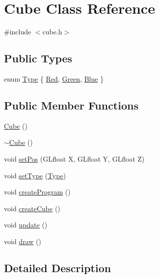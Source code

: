 \hypertarget{class_cube}{}\section{Cube Class Reference}
\label{class_cube}


{\ttfamily \#include $<$cube.\+h$>$}

\subsection*{Public Types}
\begin{DoxyCompactItemize}
\item 
enum \hyperlink{class_cube_aa23329b4c4998aa957e44b6a44b9bfcf}{Type} \{ \hyperlink{class_cube_aa23329b4c4998aa957e44b6a44b9bfcfaedfe204f7f5634d546c5baaa449f2f64}{Red}, 
\hyperlink{class_cube_aa23329b4c4998aa957e44b6a44b9bfcfa69ec033c662741ad033ae8e9fcea06a0}{Green}, 
\hyperlink{class_cube_aa23329b4c4998aa957e44b6a44b9bfcfada12dd13048ffd83ce6870545c02a338}{Blue}
 \}
\end{DoxyCompactItemize}
\subsection*{Public Member Functions}
\begin{DoxyCompactItemize}
\item 
\hyperlink{class_cube_a06f3d86fb63e3aad08623610aa3c17b4}{Cube} ()
\item 
\hyperlink{class_cube_aa814e979cecb8c451fdb332ded2cea1e}{$\sim$\+Cube} ()
\item 
void \hyperlink{class_cube_abd9a9a045a06398c14c3430953b82963}{set\+Pos} (G\+Lfloat X, G\+Lfloat Y, G\+Lfloat Z)
\item 
void \hyperlink{class_cube_a391179a0f9a0904895b66bcea77e922d}{set\+Type} (\hyperlink{class_cube_aa23329b4c4998aa957e44b6a44b9bfcf}{Type})
\item 
void \hyperlink{class_cube_a114d7b0f25a28e77ce9975f833972d24}{create\+Program} ()
\item 
void \hyperlink{class_cube_a844b34e7e438544f87350019e9ff351c}{create\+Cube} ()
\item 
void \hyperlink{class_cube_a2eb5e485e2ced5470b51a783b2ecddb1}{update} ()
\item 
void \hyperlink{class_cube_ab26b72a81376fd5dc4fcc7f0b715b087}{draw} ()
\end{DoxyCompactItemize}


\subsection{Detailed Description}


